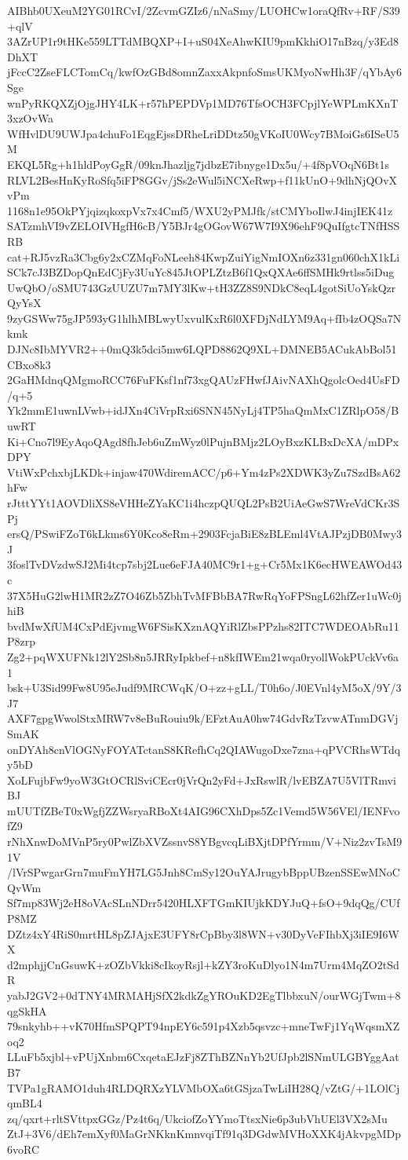 AIBhb0UXeuM2YG01RCvI/2ZcvmGZIz6/nNaSmy/LUOHCw1oraQfRv+RF/S39+qlV
3AZrUP1r9tHKe559LTTdMBQXP+I+uS04XeAhwKIU9pmKkhiO17nBzq/y3Ed8DhXT
jFccC2ZseFLCTomCq/kwfOzGBd8omnZaxxAkpnfoSmsUKMyoNwHh3F/qYbAy6Sge
wnPyRKQXZjOjgJHY4LK+r57hPEPDVp1MD76TfsOCH3FCpjlYeWPLmKXnT3xzOvWa
WfHvlDU9UWJpa4chuFo1EqgEjssDRheLriDDtz50gVKoIU0Wcy7BMoiGs6ISeU5M
EKQL5Rg+h1hldPoyGgR/09knJhazljg7jdbzE7ibnyge1Dx5u/+4f8pVOqN6Bt1s
RLVL2BesHnKyRoSfq5iFP8GGv/jSs2eWul5iNCXeRwp+f11kUnO+9dhNjQOvXvPm
1168n1e95OkPYjqizqkoxpVx7x4Cmf5/WXU2yPMJfk/stCMYboIlwJ4injIEK41z
SATzmhVI9vZELOIVHgfH6cB/Y5BJr4gOGovW67W7I9X96ehF9QuIfgtcTNfHSSRB
cat+RJ5vzRa3Cbg6y2xCZMqFoNLeeh84KwpZuiYigNmIOXn6z331gn060chX1kLi
SCk7cJ3BZDopQnEdCjFy3UuYc845JtOPLZtzB6f1QxQXAe6ffSMHk9rtlss5iDug
UwQbO/oSMU743GzUUZU7m7MY3lKw+tH3ZZ8S9NDkC8eqL4gotSiUoYskQzrQyYsX
9zyGSWw75gJP593yG1hlhMBLwyUxvulKxR6l0XFDjNdLYM9Aq+fIb4zOQSa7Nkmk
DJNc8IbMYVR2++0mQ3k5dci5mw6LQPD8862Q9XL+DMNEB5ACukAbBol51CBxo8k3
2GaHMdnqQMgmoRCC76FuFKsf1nf73xgQAUzFHwfJAivNAXhQgolcOed4UsFD/q+5
Yk2mmE1uwnLVwb+idJXn4CiVrpRxi6SNN45NyLj4TP5haQmMxC1ZRlpO58/BuwRT
Ki+Cno7l9EyAqoQAgd8fhJeb6uZmWyz0lPujnBMjz2LOyBxzKLBxDcXA/mDPxDPY
VtiWxPchxbjLKDk+injaw470WdiremACC/p6+Ym4zPs2XDWK3yZu7SzdBsA62hFw
rJtttYYt1AOVDliXS8eVHHeZYaKC1i4hczpQUQL2PsB2UiAeGwS7WreVdCKr3SPj
ersQ/PSwiFZoT6kLkms6Y0Kco8eRm+2903FcjaBiE8zBLEml4VtAJPzjDB0Mwy3J
3foslTvDVzdwSJ2Mi4tcp7sbj2Lue6eFJA40MC9r1+g+Cr5Mx1K6ecHWEAWOd43c
37X5HuG2lwH1MR2zZ7O46Zb5ZbhTvMFBbBA7RwRqYoFPSngL62hfZer1uWc0jhiB
bvdMwXfUM4CxPdEjvmgW6FSisKXznAQYiRlZbsPPzhs82ITC7WDEOAbRu11P8zrp
Zg2+pqWXUFNk12lY2Sb8n5JRRyIpkbef+n8kfIWEm21wqa0ryollWokPUckVv6a1
bsk+U3Sid99Fw8U95eJudf9MRCWqK/O+zz+gLL/T0h6o/J0EVnl4yM5oX/9Y/3J7
AXF7gpgWwolStxMRW7v8eBuRouiu9k/EFztAuA0hw74GdvRzTzvwATnmDGVjSmAK
onDYAh8cnVlOGNyFOYATctanS8KRefhCq2QIAWugoDxe7zna+qPVCRhsWTdqy5bD
XoLFujbFw9yoW3GtOCRlSviCEcr0jVrQn2yFd+JxRswlR/lvEBZA7U5VlTRmviBJ
mUUTfZBeT0xWgfjZZWsryaRBoXt4AIG96CXhDps5Zc1Vemd5W56VEl/IENFvofZ9
rNhXnwDoMVnP5ry0PwlZbXVZssnvS8YBgvcqLiBXjtDPfYrmm/V+Niz2zvTsM91V
/lVrSPwgarGrn7muFmYH7LG5Jnh8CmSy12OuYAJrugybBppUBzenSSEwMNoCQvWm
Sf7mp83Wj2eH8oVAcSLnNDrr5420HLXFTGmKIUjkKDYJuQ+fsO+9dqQg/CUfP8MZ
DZtz4xY4RiS0mrtHL8pZJAjxE3UFY8rCpBby3l8WN+v30DyVeFIhbXj3iIE9I6WX
d2mphjjCnGsuwK+zOZbVkki8cIkoyRsjl+kZY3roKuDlyo1N4m7Urm4MqZO2tSdR
yabJ2GV2+0dTNY4MRMAHjSfX2kdkZgYROuKD2EgTlbbxuN/ourWGjTwm+8qgSkHA
79snkyhb++vK70HfmSPQPT94npEY6c591p4Xzb5qsvzc+mneTwFj1YqWqsmXZoq2
LLuFb5xjbl+vPUjXnbm6CxqetaEJzFj8ZThBZNnYb2UfJpb2lSNmULGBYggAatB7
TVPa1gRAMO1duh4RLDQRXzYLVMbOXa6tGSjzaTwLiIH28Q/vZtG/+1LOlCjqmBL4
zq/qxrt+rltSVttpxGGz/Pz4t6q/UkciofZoYYmoTtsxNie6p3ubVhUEl3VX2sMu
ZtJ+3V6/dEh7emXyf0MaGrNKknKmnvqiTf91q3DGdwMVHoXXK4jAkvpgMDp6voRC
